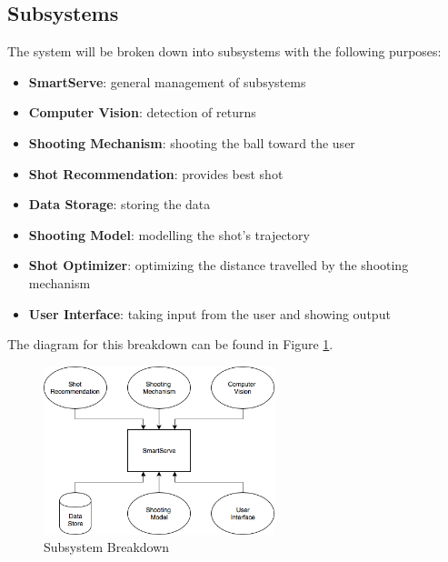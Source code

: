 \documentclass[11pt]{article}
\begin{document}
\subsection{Subsystems}
The system will be broken down into subsystems with the following purposes: 
\begin{itemize}
\item \textbf{SmartServe}: general management of subsystems
\item \textbf{Computer Vision}:  detection of returns
\item \textbf{Shooting Mechanism}:  shooting the ball toward the user
\item \textbf{Shot Recommendation}: provides best shot
\item \textbf{Data Storage}: storing the data
\item \textbf{Shooting Model}: modelling the shot's trajectory
\item \textbf{Shot Optimizer}: optimizing the distance travelled by the shooting mechanism
\item \textbf{User Interface}: taking input from the user and showing output
\end{itemize}
The diagram for this breakdown can be found in Figure \ref{fig:sub}.
\begin{figure}[H]
   \centering
   \includegraphics[width=0.6\textwidth]{img/Subsystem.png} %
   \caption{Subsystem Breakdown}
   \label{fig:sub}
\end{figure}
\end{document}
